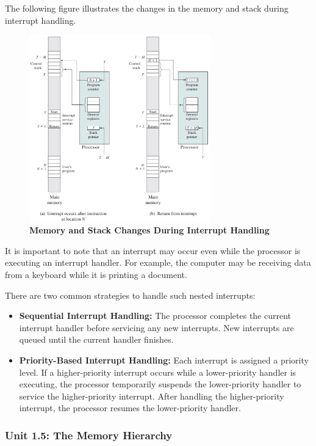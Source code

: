 \documentclass{article}
\begin{document}
The following figure illustrates the changes in the memory and stack during interrupt handling.
\begin{figure}[!h]
    \centering
    \includegraphics[width=0.7\textwidth]{figures/Ch01Figure6.png} %
    \caption{\textbf{Memory and Stack Changes During Interrupt Handling}}
    \label{fig:Ch01Fig6}
\end{figure}

It is important to note that an interrupt may occur even while the processor is executing an interrupt handler.
For example, the computer may be receiving data from a keyboard while it is printing a document.

There are two common strategies to handle such nested interrupts:
\begin{itemize}
    \item \textbf{Sequential Interrupt Handling:} The processor completes the current interrupt handler before servicing any new interrupts. New interrupts are queued until the current handler finishes.
    \item \textbf{Priority-Based Interrupt Handling:} Each interrupt is assigned a priority level. If a higher-priority interrupt occurs while a lower-priority handler is executing, the processor temporarily suspends the lower-priority handler to service the higher-priority interrupt. After handling the higher-priority interrupt, the processor resumes the lower-priority handler.
\end{itemize}

\subsubsection*{Unit 1.5: The Memory Hierarchy}
{}
\end{document}
